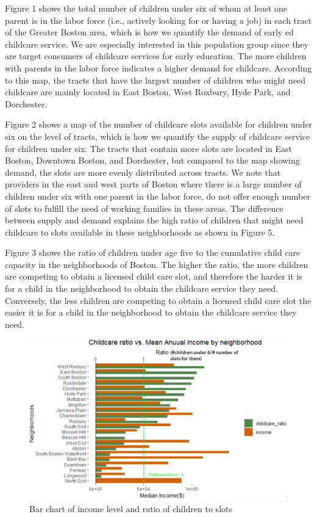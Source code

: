 \documentclass[10pt,letterpaper]{article}
\begin{document}
Figure 1 shows the total number of children under six of whom at least
one parent is in the labor force (i.e., actively looking for or having a
job) in each tract of the Greater Boston area, which is how we quantify
the demand of early ed childcare service. We are especially interested
in this population group since they are target consumers of childcare
services for early education. The more children with parents in the
labor force indicates a higher demand for childcare. According to this
map, the tracts that have the largest number of children who might need
childcare are mainly located in East Boston, West Roxbury, Hyde Park,
and Dorchester.

Figure 2 shows a map of the number of childcare slots available for
children under six on the level of tracts, which is how we quantify the
supply of childcare service for children under six. The tracts that
contain more slots are located in East Boston, Downtown Boston, and
Dorchester, but compared to the map showing demand, the slots are more
evenly distributed across tracts. We note that providers in the east and
west parts of Boston where there is a large number of children under six
with one parent in the labor force, do not offer enough number of slots
to fulfill the need of working families in these areas. The difference
between supply and demand explains the high ratio of children that might
need childcare to slots available in these neighborhoods as shown in
Figure 5.

Figure 3 shows the ratio of children under age five to the cumulative
child care capacity in the neighborhoods of Boston. The higher the
ratio, the more children are competing to obtain a licensed child care
slot, and therefore the harder it is for a child in the neighborhood to
obtain the childcare service they need. Conversely, the less children
are competing to obtain a licensed child care slot the easier it is for
a child in the neighborhood to obtain the childcare service they need.

\begin{figure}

{\centering \includegraphics[width=1\linewidth]{income} 

}

\caption{Bar chart of income level and ratio of children to slots}\label{fig:unnamed-chunk-6}
\end{figure}
\end{document}
